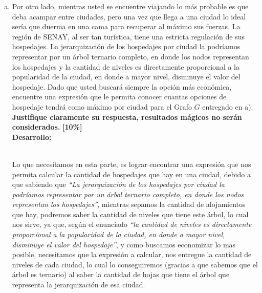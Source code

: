 \documentclass[letterpaper,10pt]{article}
\begin{document}
\begin{enumerate}[a)]
    \item Por otro lado, mientras usted se encuentre viajando lo más probable es que deba acampar entre ciudades, pero una vez que llega a una ciudad lo ideal sería que duerma en una cama para recuperar al máximo sus fuerzas. La región de SENAY, al ser tan turística, tiene una estricta regulación de sus hospedajes. La jerarquización de los hospedajes por ciudad la podríamos representar por un árbol ternario completo, en donde los nodos representan los hospedajes y la cantidad de niveles es directamente proporcional a la popularidad de la ciudad, en donde a mayor nivel, disminuye el valor del hospedaje. Dado que usted buscará siempre la opción más económica, encuentre una expresión que le permita conocer cuantas opciones de hospedaje tendrá como máximo por ciudad para el Grafo $G$ entregado en a). \textbf{Justifique claramente su respuesta, resultados mágicos no serán considerados.} \textbf{[10\%]}\\
\newline
\textbf{Desarrollo:}\\
\newline\\
\begin{minipage}[t]{0.45\textwidth}
Lo que necesitamos en esta parte, es lograr encontrar una expresión que nos permita calcular la cantidad de hospedajes que hay en una ciudad, debido a que sabiendo que \textit{``La jerarquización de los hospedajes por ciudad la podríamos representar por un árbol ternario completo, en donde los nodos representan los hospedajes''}, mientras sepamos la cantidad de alojamientos que hay, podremos saber la cantidad de niveles que tiene este árbol, lo cual nos sirve, ya que, según el enunciado \textit{``la cantidad de niveles es directamente proporcional a la popularidad de la ciudad, en donde a mayor nivel, disminuye el valor del hospedaje''}, y como buscamos economizar lo mas posible, necesitamos que la expresión a calcular, nos entregue la cantidad de niveles de cada ciudad, lo cual lo conseguiremos (gracias a que sabemos que el árbol es ternario) al saber la cantidad de hojas que tiene el árbol que representa la jerarquización de esa ciudad.\\
\end{minipage}
\hfill
\begin{minipage}[t]{0.6\textwidth}
\end{minipage}


\end{enumerate}
\end{document}
